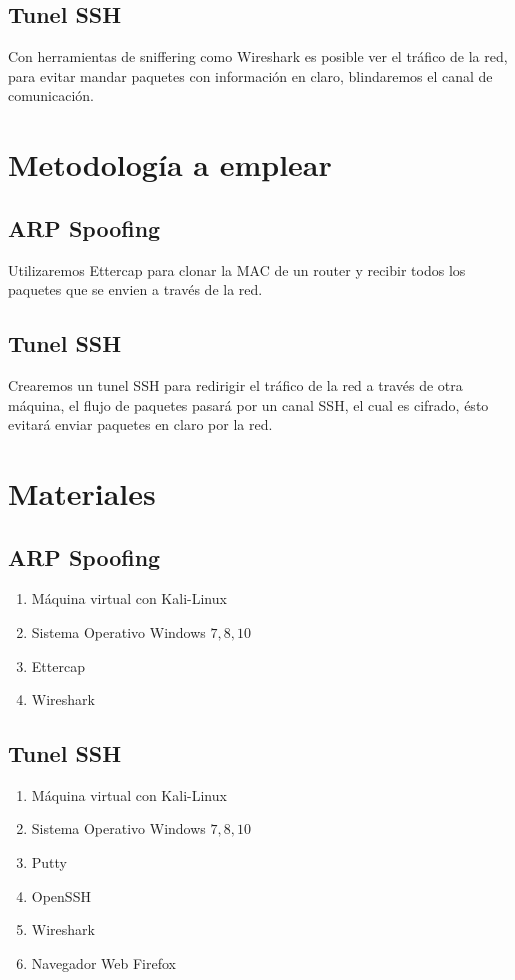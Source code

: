 \documentclass{article}
\begin{document}
\subsection{Tunel SSH}
Con herramientas de sniffering como Wireshark es posible ver el tr\'afico de la red, para evitar mandar paquetes con informaci\'on en claro, blindaremos el canal de comunicaci\'on.

\section{Metodolog\'ia a emplear}
\subsection{ARP Spoofing}
Utilizaremos Ettercap para clonar la MAC de un router y recibir todos los paquetes que se envien a trav\'es de la red.
\subsection{Tunel SSH}
Crearemos un tunel SSH para redirigir el tr\'afico de la red a trav\'es de otra m\'aquina, el flujo de paquetes pasar\'a por un canal SSH, el cual es cifrado, \'esto evitar\'a enviar paquetes en claro por la red.

\section{Materiales}

\subsection{ARP Spoofing}
\begin{enumerate}
\item M\'aquina virtual con Kali-Linux
\item Sistema Operativo Windows \(7,8,10\)
\item Ettercap
\item Wireshark
\end{enumerate}

\subsection{Tunel SSH}
\begin{enumerate}
\item M\'aquina virtual con Kali-Linux
\item Sistema Operativo Windows \(7,8,10\)
\item Putty
\item OpenSSH
\item Wireshark
\item Navegador Web Firefox
\end{enumerate}
\end{document}
